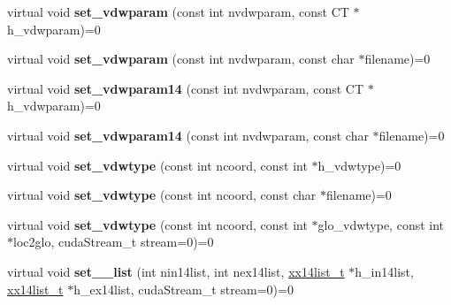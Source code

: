 \begin{DoxyCompactItemize}
\item 
\hypertarget{classCudaPMEDirectForceBase_a202f784903e8444b04f2b943d8fb2a81}{}\label{classCudaPMEDirectForceBase_a202f784903e8444b04f2b943d8fb2a81} 
virtual void {\bfseries set\+\_\+vdwparam} (const int nvdwparam, const CT $\ast$h\+\_\+vdwparam)=0
\item 
\hypertarget{classCudaPMEDirectForceBase_af58b02699036a1a84d9caaf6e4b55f1c}{}\label{classCudaPMEDirectForceBase_af58b02699036a1a84d9caaf6e4b55f1c} 
virtual void {\bfseries set\+\_\+vdwparam} (const int nvdwparam, const char $\ast$filename)=0
\item 
\hypertarget{classCudaPMEDirectForceBase_ab65455bb482279b4b7287f347d88368d}{}\label{classCudaPMEDirectForceBase_ab65455bb482279b4b7287f347d88368d} 
virtual void {\bfseries set\+\_\+vdwparam14} (const int nvdwparam, const CT $\ast$h\+\_\+vdwparam)=0
\item 
\hypertarget{classCudaPMEDirectForceBase_a29398f2e91b8615e8161439f3d69c61b}{}\label{classCudaPMEDirectForceBase_a29398f2e91b8615e8161439f3d69c61b} 
virtual void {\bfseries set\+\_\+vdwparam14} (const int nvdwparam, const char $\ast$filename)=0
\item 
\hypertarget{classCudaPMEDirectForceBase_a8702e64c4c6994f40e29e6f665a8a79b}{}\label{classCudaPMEDirectForceBase_a8702e64c4c6994f40e29e6f665a8a79b} 
virtual void {\bfseries set\+\_\+vdwtype} (const int ncoord, const int $\ast$h\+\_\+vdwtype)=0
\item 
\hypertarget{classCudaPMEDirectForceBase_ad91c8d20c9cb7f8a96e5d3452c53534f}{}\label{classCudaPMEDirectForceBase_ad91c8d20c9cb7f8a96e5d3452c53534f} 
virtual void {\bfseries set\+\_\+vdwtype} (const int ncoord, const char $\ast$filename)=0
\item 
\hypertarget{classCudaPMEDirectForceBase_a93184411ca2fc4f89611e3c407d7d95f}{}\label{classCudaPMEDirectForceBase_a93184411ca2fc4f89611e3c407d7d95f} 
virtual void {\bfseries set\+\_\+vdwtype} (const int ncoord, const int $\ast$glo\+\_\+vdwtype, const int $\ast$loc2glo, cuda\+Stream\+\_\+t stream=0)=0
\item 
\hypertarget{classCudaPMEDirectForceBase_acdc1269a7448e495c4298c89603881e9}{}\label{classCudaPMEDirectForceBase_acdc1269a7448e495c4298c89603881e9} 
virtual void {\bfseries set\+\_\+\_\+list} (int nin14list, int nex14list, \hyperlink{structxx14list__t}{xx14list\+\_\+t} $\ast$h\+\_\+in14list, \hyperlink{structxx14list__t}{xx14list\+\_\+t} $\ast$h\+\_\+ex14list, cuda\+Stream\+\_\+t stream=0)=0
\item 
\hypertarget{classCudaPMEDirectForceBase_a596d15a35fd6153ab187da5ae0a763d2}{}\label{classCudaPMEDirectForceBase_a596d15a35fd6153ab187da5ae0a763d2} 

\end{DoxyCompactItemize}
